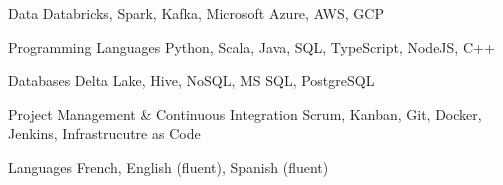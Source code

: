 \begin{cvskills}

	\cvskill
	{Data}
	{Databricks, Spark, Kafka, Microsoft Azure, AWS, GCP}
	
	\cvskill
	{Programming Languages}
	{Python, Scala, Java, SQL, TypeScript, NodeJS, C++}
	
	\cvskill
	{Databases}
	{Delta Lake, Hive, NoSQL, MS SQL, PostgreSQL}
	
	\cvskill
	{Project Management \& Continuous Integration}
	{Scrum, Kanban, Git, Docker, Jenkins, Infrastrucutre as Code}
	
	\cvskill
	{Languages}
	{French, English (fluent), Spanish (fluent)}
	
\end{cvskills}